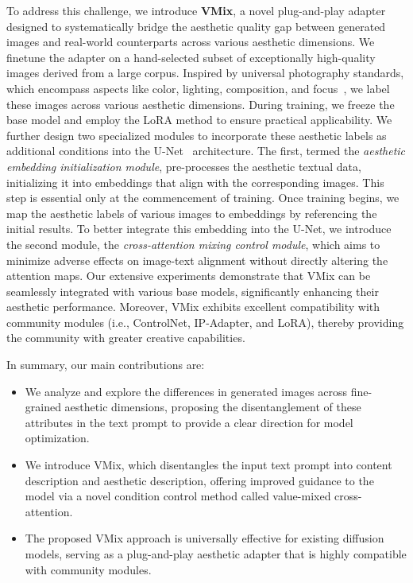 To address this challenge, we introduce \textbf{VMix}, a novel plug-and-play adapter designed to systematically bridge the aesthetic quality gap between generated images and real-world counterparts across various aesthetic dimensions. 
We finetune the adapter on a hand-selected subset of exceptionally high-quality images derived from a large corpus. Inspired by universal photography standards, which encompass aspects like color, lighting, composition, and focus~\cite{dai2023emu}, we label these images across various aesthetic dimensions.
During training, we freeze the base model and employ the LoRA\cite{hu2021lora} method to ensure practical applicability.
We further design two specialized modules to incorporate these aesthetic labels as additional conditions into the U-Net~\cite{ronneberger2015u} architecture. The first, termed the \emph{aesthetic embedding initialization module}, pre-processes the aesthetic textual data, initializing it into embeddings that align with the corresponding images. 
This step is essential only at the commencement of training. 
Once training begins, we map the aesthetic labels of various images to embeddings by referencing the initial results. 
To better integrate this embedding into the U-Net, we introduce the second module, the \emph{cross-attention mixing control module}, which aims to minimize adverse effects on image-text alignment without directly altering the attention maps.
Our extensive experiments demonstrate that VMix can be seamlessly integrated with various base models, significantly enhancing their aesthetic performance. Moreover, VMix exhibits excellent compatibility with community modules (i.e., ControlNet\cite{zhang2023adding}, IP-Adapter\cite{ye2023ip}, and LoRA\cite{hu2021lora}), thereby providing the community with greater creative capabilities.

In summary, our main contributions are:
\begin{itemize}
    \item We analyze and explore the differences in generated images across fine-grained aesthetic dimensions, proposing the disentanglement of these attributes in the text prompt to provide a clear direction for model optimization. 
    \item We introduce VMix, which disentangles the input text prompt into content description and aesthetic description, offering improved guidance to the model via a novel condition control method called value-mixed cross-attention.
    \item The proposed VMix approach is universally effective for existing diffusion models, serving as a plug-and-play aesthetic adapter that is highly compatible with community modules.
\end{itemize}
